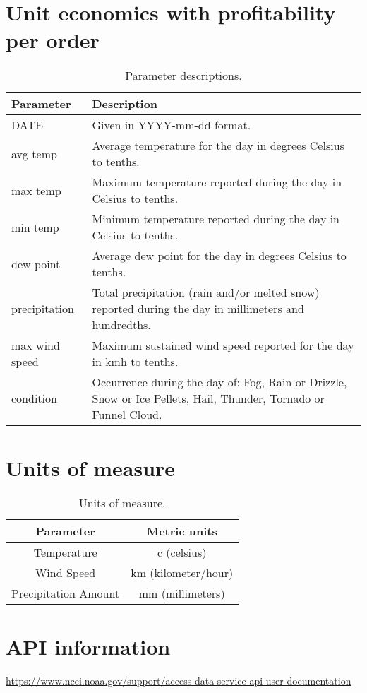 \documentclass[11pt]{article}
\begin{document}
\section{Unit economics with profitability per order}
\begin{table}[H]
\centering
\begin{tabular}{|p{3cm}|p{10cm}|} 
\hline
\bfseries Parameter & \bfseries Description  \\
\hline\hline
DATE & Given in YYYY-mm-dd format.\\ 
\hline
avg temp & Average temperature for the day in degrees Celsius to tenths.\\
\hline
max temp & Maximum temperature reported during the day in Celsius to tenths.\\
\hline
min temp & Minimum temperature reported during the day in Celsius to tenths.\\
\hline
dew point & Average dew point for the day in degrees Celsius to tenths.\\
\hline
precipitation & Total precipitation (rain and/or melted snow) reported during the day in millimeters and hundredths.\\
\hline
max wind speed & Maximum sustained wind speed reported for the day in kmh to tenths.\\
\hline
condition & Occurrence during the day of: Fog, Rain or Drizzle, Snow or Ice Pellets, Hail, Thunder, Tornado or Funnel Cloud.\\
\hline
\end{tabular}
\caption{Parameter descriptions.}
\label{table:1}
\end{table}
\section{Units of measure}
\begin{table}[H]
\centering
\begin{tabular}{|c|c|} 
\hline
\bfseries Parameter & \bfseries Metric units  \\
\hline\hline
Temperature & c (celsius)\\ 
\hline
Wind Speed & km (kilometer/hour)\\ 
\hline
Precipitation Amount & mm (millimeters)\\ 
\hline
\end{tabular}
\caption{Units of measure.}
\label{table:1}
\end{table}
\section{API information}
\url{https://www.ncei.noaa.gov/support/access-data-service-api-user-documentation}
\end{document}
